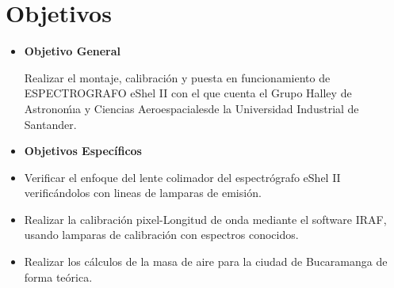 \documentclass[11pt]{article}
\begin{document}











\section{Objetivos}


\begin{itemize}
\item \textbf{Objetivo General}

Realizar el montaje, calibración y puesta en funcionamiento de ESPECTROGRAFO eShel II con el que cuenta el Grupo Halley de Astronoḿıa y Ciencias Aeroespacialesde la Universidad Industrial de Santander.\\

\item \textbf{Objetivos Espec\'ificos}
\end{itemize}

\begin{itemize}


\item Verificar el enfoque del lente colimador del espectrógrafo eShel II verificándolos con lineas de lamparas de emisión.

\item Realizar la calibración pixel-Longitud de onda mediante el software IRAF, usando lamparas de calibración con espectros conocidos.

\item Realizar los cálculos de la masa de aire para la ciudad de Bucaramanga de forma teórica.

\end{itemize}




\newpage

\end{document}

